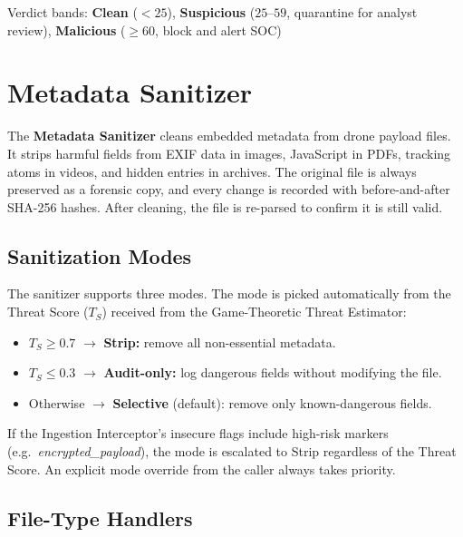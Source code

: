 \documentclass[12pt, a4paper]{report}
\begin{document}
Verdict bands: \textbf{Clean} ($< 25$), \textbf{Suspicious} ($25$--$59$,
quarantine for analyst review), \textbf{Malicious} ($\geq 60$, block and
alert SOC)

\cleardoublepage


\chapter{Metadata Sanitizer}
\label{chap:metadata_sanitizer}

The \textbf{Metadata Sanitizer} cleans embedded metadata from drone
payload files. It strips harmful fields from EXIF data in images,
JavaScript in PDFs, tracking atoms in videos, and hidden entries in
archives. The original file is always preserved as a forensic copy,
and every change is recorded with before-and-after SHA-256 hashes.
After cleaning, the file is re-parsed to confirm it is still valid.

\section{Sanitization Modes}

The sanitizer supports three modes. The mode is picked automatically
from the Threat Score ($T_S$) received from the Game-Theoretic Threat
Estimator:

\begin{itemize}
    \item $T_S \geq 0.7$ $\to$ \textbf{Strip:} remove all non-essential metadata.
    \item $T_S \leq 0.3$ $\to$ \textbf{Audit-only:} log dangerous fields without modifying the file.
    \item Otherwise $\to$ \textbf{Selective} (default): remove only known-dangerous fields.
\end{itemize}

If the Ingestion Interceptor's insecure flags include high-risk markers
(e.g.\ \emph{encrypted\_payload}), the mode is escalated to Strip
regardless of the Threat Score. An explicit mode override from the
caller always takes priority.

\section{File-Type Handlers}
\end{document}
